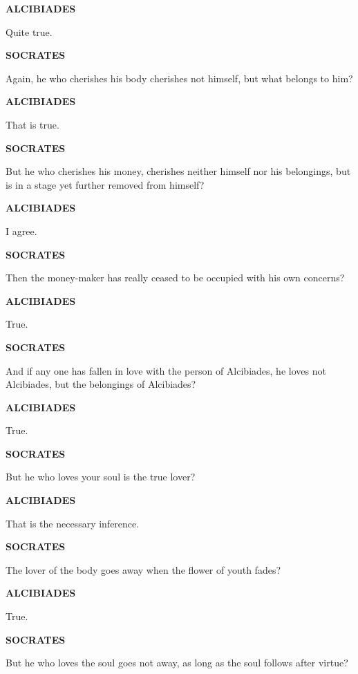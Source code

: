 \documentclass[11pt,letter]{article}
\begin{document}
\par \textbf{ALCIBIADES}
\par   Quite true.

\par \textbf{SOCRATES}
\par   Again, he who cherishes his body cherishes not himself, but what belongs to him?

\par \textbf{ALCIBIADES}
\par   That is true.

\par \textbf{SOCRATES}
\par   But he who cherishes his money, cherishes neither himself nor his belongings, but is in a stage yet further removed from himself?

\par \textbf{ALCIBIADES}
\par   I agree.

\par \textbf{SOCRATES}
\par   Then the money-maker has really ceased to be occupied with his own concerns?

\par \textbf{ALCIBIADES}
\par   True.

\par \textbf{SOCRATES}
\par   And if any one has fallen in love with the person of Alcibiades, he loves not Alcibiades, but the belongings of Alcibiades?

\par \textbf{ALCIBIADES}
\par   True.

\par \textbf{SOCRATES}
\par   But he who loves your soul is the true lover?

\par \textbf{ALCIBIADES}
\par   That is the necessary inference.

\par \textbf{SOCRATES}
\par   The lover of the body goes away when the flower of youth fades?

\par \textbf{ALCIBIADES}
\par   True.

\par \textbf{SOCRATES}
\par   But he who loves the soul goes not away, as long as the soul follows after virtue?
\end{document}
